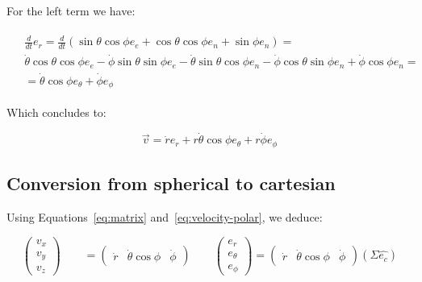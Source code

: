 \documentclass{article}
\newcommand{\east}{e_e}
\newcommand{\north}{e_n}
\newcommand{\up}{e_n}
\newcommand{\range}{e_r}
\newcommand{\bearing}{e_\theta}
\newcommand{\elevation}{e_\phi}
\newcommand{\rrate}{\dot{r}}
\newcommand{\brate}{\dot{\theta}}
\newcommand{\erate}{\dot{\phi}}
\newcommand{\carvec}{\hat{e_{c}}}
\begin{document}
For the left term we have:

\begin{align*}
\begin{split}
& \frac{d}{dt} \range = \frac{d}{dt}(\sin \theta \cos \phi \east + \cos \theta
\cos \phi \north + \sin \phi \up ) =  \\ 
& \brate \cos \theta \cos \phi \east -
\erate \sin \theta \sin \phi \east - \brate \sin \theta \cos \phi \north - \erate \cos
\theta \sin \phi \north + \erate \cos \phi \up = \\
& = \brate \cos \phi \bearing + \erate \elevation 
\end{split}
\end{align*}


Which concludes to:

\begin{equation}\label{eq:velocity-polar}
\vec{v} = \rrate \range + r \brate \cos \phi \bearing + r \erate \elevation 
\end{equation}

\subsection{Conversion from spherical to cartesian}
Using Equations~\ref{eq:matrix} and~\ref{eq:velocity-polar}, we deduce:


\begin{equation}\label{eq:car-polar}
\begin{pmatrix}
    v_x \\
   v_y \\
    v_z
  \end{pmatrix}
  \qquad
  = \begin{pmatrix}
    \rrate & \brate \cos \phi & \erate
  \end{pmatrix}
  \qquad
  \begin{pmatrix}
    \range \\
   \bearing \\
    \elevation
  \end{pmatrix}
  = \begin{pmatrix}
    \rrate & \brate \cos \phi & \erate
  \end{pmatrix} (\Sigma \carvec)
\end{equation}
\end{document}
